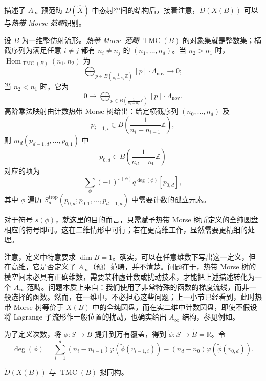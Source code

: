 描述了 $A_\infty$ 预范畴 $D(\widehat X)$ 中态射空间的结构后，接着注意，$\check D(X(B))$ 可以与\emph{热带 Morse 范畴}识别。

\begin{definition}\label{def:8.25}
设 $B$ 为一维整仿射流形。\emph{热带 Morse 范畴} $\operatorname{TMC}(B)$ 的对象集就是整数集；横截序列为满足任意 $i\ne j$ 都有 $n_i\ne n_j$ 的 $(n_1,\ldots,n_d)$。当 $n_2>n_1$ 时，$\operatorname{Hom}_{\operatorname{TMC}(B)}(n_1,n_2)$ 为
\[
\bigoplus_{p\in B(\frac1{n_2-n_1}\mathbb Z)}[p]\cdot\Lambda_{\mathrm{nov}}
\longrightarrow0;
\]
当 $n_2<n_1$ 时，它为
\[
0\longrightarrow
\bigoplus_{p\in B(\frac1{n_2-n_1}\mathbb Z)}[p]\cdot\Lambda_{\mathrm{nov}}.
\]
高阶乘法映射由计数热带 Morse 树给出：给定横截序列 $(n_0,\ldots,n_d)$ 及
\[
p_{i-1,i}\in B\left(\frac1{n_i-n_{i-1}}\mathbb Z\right),
\]
则 $m_d(p_{d-1,d},\ldots,p_{0,1})$ 中
\[
p_{0,d}\in B\left(\frac1{n_d-n_0}\mathbb Z\right)
\]
对应的项为
\[
\sum_\phi(-1)^{s(\phi)}q^{\deg(\phi)}[p_{0,d}],
\]
其中 $\phi$ 遍历 $S_d^{\mathrm{trop}}(p_{0,d};p_{0,1},\ldots,p_{d-1,d})$ 中需要计数的孤立元素。

对于符号 $s(\phi)$，就这里的目的而言，只需赋予热带 Morse 树所定义的全纯圆盘相应的符号即可。这在二维情形中可行；若在更高维工作，显然需要更精细的处理。

注意，定义中特意要求 $\dim B=1$。确实，可以在任意维数下写出这一定义，但在高维，它是否定义了 $A_\infty$（预）范畴，并不清楚。问题在于，热带 Morse 树的模空间未必具有正确维数，需要某种虚计数或扰动技术，才能把上述描述转化为一个 $A_\infty$ 范畴。问题本质上来自：我们使用了非常特殊的函数的梯度流线，而非一般选择的函数。然而，在一维中，不必担心这些问题；上一小节已经看到，此时热带 Morse 树等价于 $X(B)$ 中的全纯圆盘，而在实二维中计数圆盘，即使不假设将 Lagrange 子流形作一般位置的扰动，也确实给出 $A_\infty$ 结构，参见例如。

为了定义次数，将 $\phi\colon S\to B$ 提升到万有覆盖，得到 $\widetilde\phi\colon S\to\widetilde B=\mathbb R$。令
\[
\deg(\phi)=\sum_{i=1}^d(n_i-n_{i-1})
\varphi(\widetilde\phi(v_{i-1,i}))
-(n_d-n_0)\varphi(\widetilde\phi(v_{0,d})).
\]
\end{definition}

\begin{proposition}\label{prop:8.26}
$\check D(X(B))$ 与 $\operatorname{TMC}(B)$ 拟同构。
\end{proposition}

